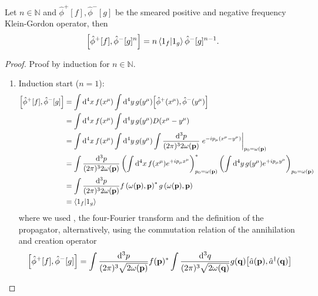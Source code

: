 \begin{theorem}\label{thm:qkg_comm_smeared_pn}
	Let $n\in\mathbb{N}$ and $\hat\phi^+[f],\hat\phi^-[g]$ be the smeared positive and negative frequency Klein-Gordon operator, then
	\begin{equation}
		\comm{\hat\phi^+[f]}{\hat\phi^-[g]^n}
		=
		n
		\braket{1_f}{1_g}
		\hat\phi^-[g]^{n-1}
		.
	\end{equation}
\end{theorem}
\begin{proof}
	Proof by induction for $n\in\mathbb{N}$.
	\begin{enumerate}
		\item Induction start ($n=1$):
		\begin{equation*}
			\begin{split}
				\comm{\hat\phi^+[f]}{\hat\phi^-[g]}
				&=
				\int\dd[4]{x}f(x^\mu)
				\int\dd[4]{y}g(y^\mu)
				\comm{\hat\phi^+(x^\mu)}{\hat\phi^-(y^\mu)}
				\\
				&=
				\int\dd[4]{x}f(x^\mu)
				\int\dd[4]{y}g(y^\mu)
				D(x^\mu-y^\mu)
				\\
				&=
				\int\dd[4]{x}f(x^\mu)
				\int\dd[4]{y}g(y^\mu)
				\int\frac{\dd[3]{p}}{(2\pi)^32\omega(\vb{p})}
				\eval{e^{-ip_\mu(x^\mu-y^\mu)}}_{p_0=\omega(\vb{p})}
				\\
				&=
				\int\frac{\dd[3]{p}}{(2\pi)^32\omega(\vb{p})}
				\left(
					\int\dd[4]{x}
					f(x^\mu)
					e^{+ip_\mu x^\mu}
				\right)^*_{p_0=\omega(\vb{p})}
				\left(
					\int\dd[4]{y}
					g(y^\mu)
					e^{+ip_\mu y^\mu}
				\right)_{p_0=\omega(\vb{p})}
				\\
				&=
				\int\frac{\dd[3]{p}}{(2\pi)^32\omega(\vb{p})}
				f\left(\omega(\vb{p}),\vb{p}\right)^*
				g\left(\omega(\vb{p}),\vb{p}\right)
				\\
				&=
				\braket{1_f}{1_g}
			\end{split}
		\end{equation*}
		where we used , the four-Fourier transform and the definition of the propagator, alternatively, using the commutation relation of the annihilation and creation operator
		\begin{equation*}
			\begin{split}
				\comm{\hat\phi^+[f]}{\hat\phi^-[g]}
				&=
				\int\frac{\dd[3]{p}}{(2\pi)^3\sqrt{2\omega(\vb{p})}}
				f(\vb{p})^*
				\int\frac{\dd[3]{q}}{(2\pi)^3\sqrt{2\omega(\vb{q})}}
				g(\vb{q})
				\comm{\hat{a}(\vb{p})}{\hat{a}^\dagger(\vb{q})}
				\\

\end{split}
\end{equation*}
\end{enumerate}
\end{proof}
